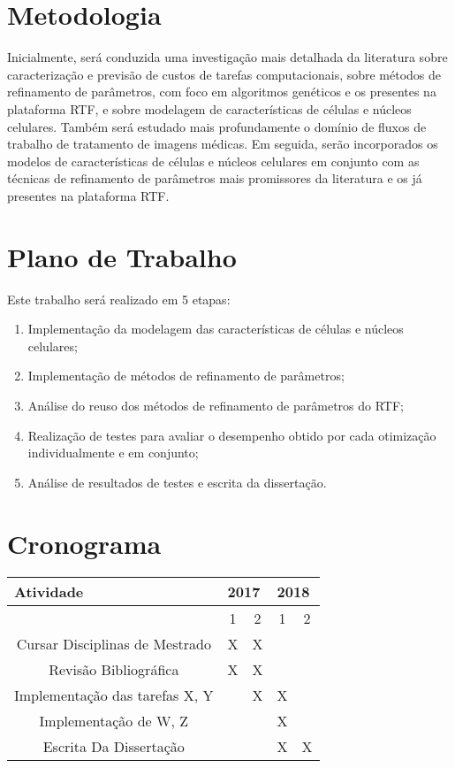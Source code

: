 \documentclass[a4paper,10pt]{article}
\begin{document}
\section{Metodologia}
Inicialmente, será conduzida uma investigação mais detalhada da literatura sobre caracterização e previsão de custos de tarefas computacionais, sobre métodos de refinamento de parâmetros, com foco em algoritmos genéticos e os presentes na plataforma RTF, e sobre modelagem de características de células e núcleos celulares. Também será estudado mais profundamente o domínio de fluxos de trabalho de tratamento de imagens médicas. Em seguida, serão incorporados os modelos de características de células e núcleos celulares em conjunto com as técnicas de refinamento de parâmetros mais promissores da literatura e os já presentes na plataforma RTF.

\section{Plano de Trabalho}

Este trabalho será realizado em 5 etapas:
\begin{enumerate}
	\item Implementação da modelagem das características de células e núcleos celulares;
	\item Implementação de métodos de refinamento de parâmetros;
	\item Análise do reuso dos métodos de refinamento de parâmetros do RTF;
	\item Realização de testes para avaliar o desempenho obtido por cada otimização individualmente e em conjunto;
	\item Análise de resultados de testes e escrita da dissertação.
\end{enumerate}


\section{Cronograma}
\begin{table}[!h]
	\centering
	\label{my-label}
	\begin{tabular}{|c|c|c|c|c|}
		\hline
		\multicolumn{1}{|l|}{Atividade} & \multicolumn{2}{l|}{2017} & \multicolumn{2}{l|}{2018} \\ \hline
		& 1\degree    & 2\degree    & 1\degree    & 2\degree    \\ \hline
		Cursar Disciplinas de Mestrado  & X           &  X           &             &             \\ \hline
		Revisão Bibliográfica           & X           & X           &             &             \\ \hline
		Implementação das tarefas X, Y  &             & X           & X           &             \\ \hline
		Implementação de W, Z     &             &             & X           &             \\ \hline
		Escrita Da Dissertação          &             &             & X           & X           \\ \hline
	\end{tabular}
\end{table}
\end{document}
